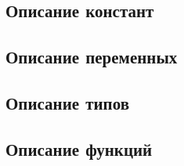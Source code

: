 \hypertarget{constants}{%
\subsection{Описание констант}\label{decls:constants}}

\hypertarget{variables}{%
\subsection{Описание переменных}\label{decls:variables}}

\hypertarget{types}{%
\subsection{Описание типов}\label{decls:types}}

\hypertarget{functions}{%
\subsection{Описание функций}\label{decls:functions}}